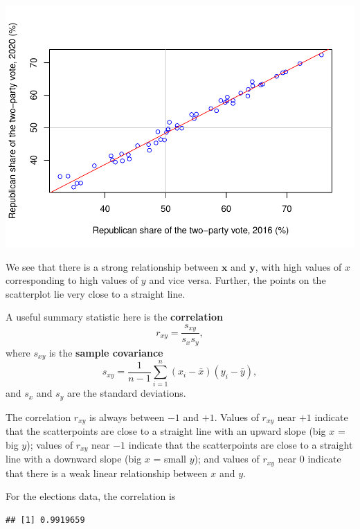 \documentclass[
  a4paper,
]{book}
\newenvironment{Shaded}{\begin{snugshade}}{\end{snugshade}}
\newcommand{\FunctionTok}[1]{\textcolor[rgb]{0.00,0.00,0.00}{#1}}
\newcommand{\NormalTok}[1]{#1}
\newcommand{\SpecialCharTok}[1]{\textcolor[rgb]{0.00,0.00,0.00}{#1}}
\theoremstyle{definition}
\theoremstyle{definition}
\theoremstyle{definition}
\theoremstyle{definition}
\theoremstyle{remark}
\begin{document}
\includegraphics{math1710_files/figure-latex/elections-1.pdf}

We see that there is a strong relationship between \(\mathbf x\) and \(\mathbf y\), with high values of \(x\) corresponding to high values of \(y\) and vice versa. Further, the points on the scatterplot lie very close to a straight line.

A useful summary statistic here is the \textbf{correlation}
\[ r_{xy} = \frac{s_{xy}}{s_x s_y} , \]
where \(s_{xy}\) is the \textbf{sample covariance}
\[ s_{xy} = \frac{1}{n-1} \sum_{i=1}^n (x_i - \bar x)(y_i - \bar y) , \]
and \(s_x\) and \(s_y\) are the standard deviations.

The correlation \(r_{xy}\) is always between \(-1\) and \(+1\). Values of \(r_{xy}\) near \(+1\) indicate that the scatterpoints are close to a straight line with an upward slope (big \(x\) = big \(y\)); values of \(r_{xy}\) near \(-1\) indicate that the scatterpoints are close to a straight line with a downward slope (big \(x\) = small \(y\)); and values of \(r_{xy}\) near 0 indicate that there is a weak linear relationship between \(x\) and \(y\).

For the elections data, the correlation is

\begin{Shaded}
\end{Shaded}

\begin{verbatim}
## [1] 0.9919659
\end{verbatim}
\end{document}
